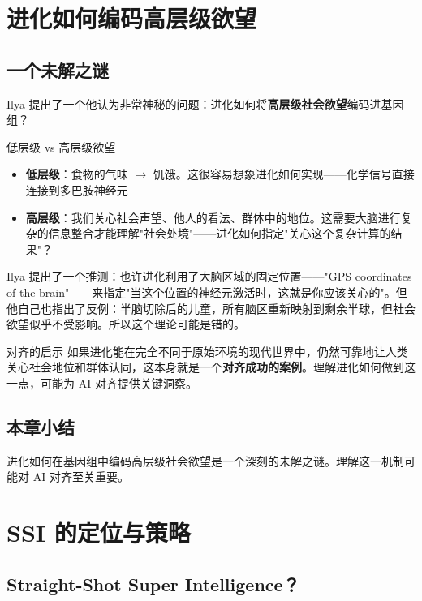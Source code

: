 \documentclass[a4paper]{article}
\begin{document}
\section{进化如何编码高层级欲望}

\subsection{一个未解之谜}

Ilya 提出了一个他认为非常神秘的问题：进化如何将\textbf{高层级社会欲望}编码进基因组？

\begin{knowledgebox}{低层级 vs 高层级欲望}
\begin{itemize}
    \item \textbf{低层级}：食物的气味 $\rightarrow$ 饥饿。这很容易想象进化如何实现——化学信号直接连接到多巴胺神经元
    \item \textbf{高层级}：我们关心社会声望、他人的看法、群体中的地位。这需要大脑进行复杂的信息整合才能理解"社会处境"——进化如何指定"关心这个复杂计算的结果"？
\end{itemize}
\end{knowledgebox}

Ilya 提出了一个推测：也许进化利用了大脑区域的固定位置——"GPS coordinates of the brain"——来指定"当这个位置的神经元激活时，这就是你应该关心的"。但他自己也指出了反例：半脑切除后的儿童，所有脑区重新映射到剩余半球，但社会欲望似乎不受影响。所以这个理论可能是错的。

\begin{importantbox}{对齐的启示}
如果进化能在完全不同于原始环境的现代世界中，仍然可靠地让人类关心社会地位和群体认同，这本身就是一个\textbf{对齐成功的案例}。理解进化如何做到这一点，可能为 AI 对齐提供关键洞察。
\end{importantbox}

\subsection{本章小结}

进化如何在基因组中编码高层级社会欲望是一个深刻的未解之谜。理解这一机制可能对 AI 对齐至关重要。


\section{SSI 的定位与策略}

\subsection{Straight-Shot Super Intelligence？}
\end{document}

